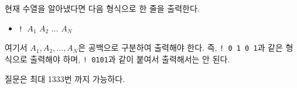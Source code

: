 현재 수열을 알아냈다면 다음 형식으로 한 줄을 출력한다.

\begin{itemize}
    \item \texttt{! }$A_1$ $A_2$ $\dots$ $A_N$
\end{itemize}

여기서 $A_1, A_2, \dots, A_N$은 공백으로 구분하여 출력해야 한다.
즉, \texttt{! 0 1 0 1}과 같은 형식으로 출력해야 하며, \texttt{! 0101}과 같이 붙여서 출력해서는 안 된다.

질문은 최대 1333번 까지 가능하다.